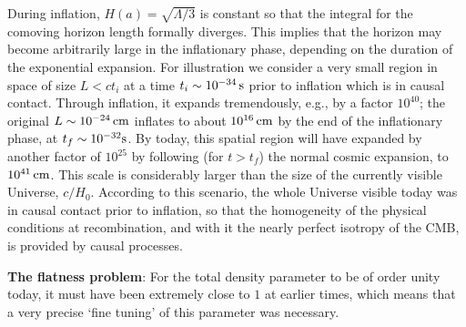 \documentclass[a4paper,11pt]{article}
\begin{document}
{\noindent}During inflation, $H(a)=\sqrt{\Lambda/3}$ is constant so that the integral for the comoving horizon length formally diverges. This implies that the horizon may become arbitrarily large in the inflationary phase, depending on the duration of the exponential expansion. For illustration we consider a very small region in space of size $L<ct_i$ at a time $t_i\sim10^{-34}\,{\rm s}$ prior to inflation which is in causal contact. Through inflation, it expands tremendously, e.g., by a factor $10^{40}$; the original $L\sim10^{-24}\,{\rm cm}$ inflates to about $10^{16}\,{\rm cm}$ by the end of the inflationary phase, at $t_f\sim10^{-32}{\rm s}$. By today, this spatial region will have expanded by another factor of $10^{25}$ by following (for $t>t_f$) the normal cosmic expansion, to   $10^{41}\,{\rm cm}$. This scale is considerably larger than the size of the currently visible Universe, $c/H_0$. According to this scenario, the whole Universe visible today was in causal contact prior to inflation, so that the homogeneity of the physical conditions at recombination, and with it the nearly perfect isotropy of the CMB, is provided by causal processes.

{\noindent}\textbf{The flatness problem}: For the total density parameter to be of order unity today, it must have been extremely close to $1$ at earlier times, which means that a very precise `fine tuning' of this parameter was necessary.
\end{document}
